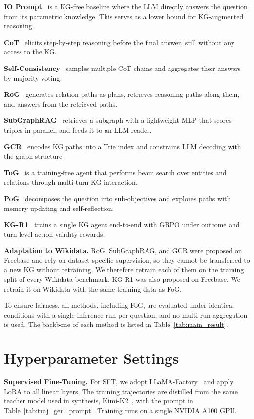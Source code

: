 \textbf{IO Prompt}~\cite{gpt-4,qwen,deepseekv3} is a KG-free baseline where the LLM directly answers the question from its parametric knowledge. This serves as a lower bound for KG-augmented reasoning.

\textbf{CoT}~\cite{CoT} elicits step-by-step reasoning before the final answer, still without any access to the KG.

\textbf{Self-Consistency}~\cite{Self-Consistency} samples multiple CoT chains and aggregates their answers by majority voting.

\textbf{RoG}~\cite{RoG} generates relation paths as plans, retrieves reasoning paths along them, and answers from the retrieved paths.

\textbf{SubGraphRAG}~\cite{SubGraphRAG} retrieves a subgraph with a lightweight MLP that scores triples in parallel, and feeds it to an LLM reader.

\textbf{GCR}~\cite{GCR} encodes KG paths into a Trie index and constrains LLM decoding with the graph structure.

\textbf{ToG}~\cite{ToG} is a training-free agent that performs beam search over entities and relations through multi-turn KG interaction.

\textbf{PoG}~\cite{PoG} decomposes the question into sub-objectives and explores paths with memory updating and self-reflection.

\textbf{KG-R1}~\cite{KG-R1} trains a single KG agent end-to-end with GRPO under outcome and turn-level action-validity rewards.

\textbf{Adaptation to Wikidata.}
RoG, SubGraphRAG, and GCR were proposed on Freebase and rely on dataset-specific supervision, so they cannot be transferred to a new KG without retraining. We therefore retrain each of them on the training split of every Wikidata benchmark. KG-R1 was also proposed on Freebase. We retrain it on Wikidata with the same training data as FoG.

\label{app:inference_setting}
To ensure fairness, all methods, including FoG, are evaluated under identical conditions with a single inference run per question, and no multi-run aggregation is used. The backbone of each method is listed in Table~\ref{tab:main_result}.

\section{Hyperparameter Settings}
\label{app:training}
\textbf{Supervised Fine-Tuning.}
\label{app:sft}
For SFT, we adopt LLaMA-Factory~\cite{zheng2024llamafactory} and apply LoRA to all linear layers. The training trajectories are distilled from the same teacher model used in synthesis, Kimi-K2~\cite{kimi}, with the prompt in Table~\ref{tab:traj_gen_prompt}. Training runs on a single NVIDIA A100 GPU.

